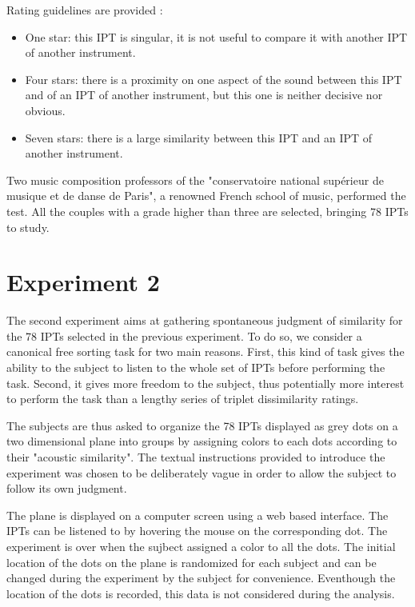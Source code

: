 \documentclass{article}
\newcommand{\ipt}{IPT\xspace}
\newcommand{\ipts}{IPTs\xspace}
\begin{document}
Rating guidelines are provided :
\begin{itemize}
  \item One star: this \ipt is singular, it is not useful to compare it with another \ipt of another instrument.
  \item Four stars: there is a proximity on one aspect of the sound between this \ipt and of an \ipt of another instrument, but this one is neither decisive nor obvious.
  \item Seven stars: there is a large similarity between this \ipt and an \ipt of another instrument.
\end{itemize}

Two music composition professors of the "conservatoire national sup\'erieur de musique et de danse de Paris", a renowned French school of music, performed the test. All the couples with a grade higher than three are selected, bringing 78 \ipts to study.

\section{Experiment 2}\label{sec:xp2}

The second experiment aims at gathering spontaneous judgment of similarity for the 78 \ipts selected in the previous experiment. To do so, we consider a canonical free sorting task for two main reasons. First, this kind of task gives the ability to the subject to listen to the whole set of \ipts before performing the task. Second, it gives more freedom to the subject, thus potentially more interest to perform the task than a lengthy series of triplet dissimilarity ratings.

The subjects are thus asked to organize the 78 \ipts displayed as grey dots on a two dimensional plane into groups by assigning colors to each dots according to their "acoustic similarity". The textual instructions provided to introduce the experiment was chosen to be deliberately vague in order to allow the subject to follow its own judgment.

The plane is displayed on a computer screen using a web based interface. The \ipts can be listened to by hovering the mouse on the corresponding dot. The experiment is over when the sujbect assigned a color to all the dots. The initial location of the dots on the plane is randomized for each subject and can be changed during the experiment by the subject for convenience. Eventhough the location of the dots is recorded, this data is not considered during the analysis.
\end{document}
